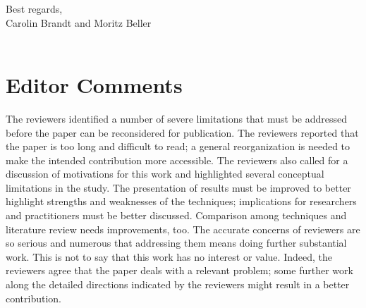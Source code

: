 \documentclass[10pt,a4wide]{article}
\renewenvironment{leftbar}{%
	\vspace{0.1cm}
	\def\FrameCommand{\vrule width 0.4pt \hspace{15pt}}%
	\MakeFramed {\advance\hsize-\width \FrameRestore}}%
{\endMakeFramed\vspace{0.1cm}}
\begin{document}





Best regards,
\\
Carolin Brandt and Moritz Beller
\\\\
\noindent


\begin{leftbar}

\end{leftbar}


\section*{Editor Comments}

\begin{leftbar}
The reviewers identified a number of severe limitations that must be addressed before the paper can be reconsidered for publication. The reviewers reported that the paper is too long and difficult to read; a general reorganization is needed to make the intended contribution more accessible. The reviewers also called for a discussion of motivations for this work and highlighted several conceptual limitations in the study. The presentation of results must be improved to better highlight strengths and weaknesses of the techniques; implications for researchers and practitioners must be better discussed. Comparison among techniques and literature review needs improvements, too. The accurate concerns of reviewers are so serious and numerous that addressing them means doing further substantial work. This is not to say that this work has no interest or value. Indeed, the reviewers agree that the paper deals with a relevant problem; some further work along the detailed directions indicated by the reviewers might result in a better contribution.
\end{leftbar}
\end{document}
